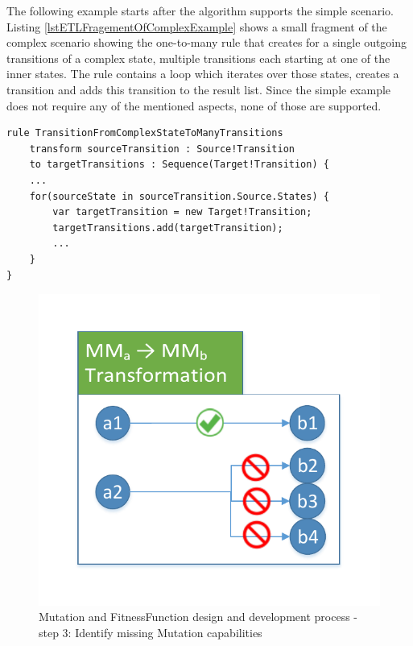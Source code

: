 The following example starts after the algorithm supports the simple scenario. Listing \ref{lstETLFragementOfComplexExample} shows a small fragment of the complex scenario showing the one-to-many rule that creates for a single outgoing transitions of a complex state, multiple transitions each starting at one of the inner states. The rule contains a loop which iterates over those states, creates a transition and adds this transition to the result list. Since the simple example does not require any of the mentioned aspects, none of those are supported.

\begin{lstlisting}[language=ETL,caption={Fragment of Complex State Machine to Simple State Machine \gls{ModelToModelTransformation} in \gls{ConcreteSyntax} of \Gls{EpsilonTransformationLanguage}},label={lstETLFragementOfComplexExample}]
rule TransitionFromComplexStateToManyTransitions
	transform sourceTransition : Source!Transition
	to targetTransitions : Sequence(Target!Transition) {
	...
	for(sourceState in sourceTransition.Source.States) {
		var targetTransition = new Target!Transition;
		targetTransitions.add(targetTransition);
		...
	}
}
\end{lstlisting}

\begin{figure}[!ht]
	\centering
	\includegraphics[scale=0.5, trim=0cm 1cm 0cm 1cm, clip=true]{Images/MutationAndFitnessFunctionDesignProcess-Step3.pdf} 
	\caption{\Gls{Mutation} and \gls{FitnessFunction} design and development process - step 3: Identify missing \gls{Mutation} capabilities}
	\label{figMutationAndFitnessFunctionDesignProcess-Step3}
\end{figure}


